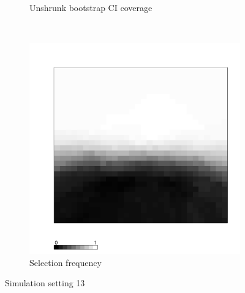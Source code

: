 \documentclass[authoryear, review, 11pt]{elsarticle}
\begin{document}
\begin{figure}
\begin{subfigure}[b]{0.45\textwidth}
		\caption{Unshrunk bootstrap CI coverage}
	\end{subfigure}%
	~ %
	\begin{subfigure}[b]{0.45\textwidth}
	\centering
		\includegraphics[width=\textwidth]{../../figures/simulation/X1.15.13.selection.pdf}
		\caption{Selection frequency}
	\end{subfigure}
	\caption{Simulation setting 13}
\end{figure}
\end{document}
